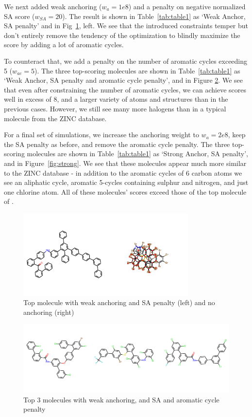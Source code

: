 \documentclass{article}
\begin{document}
We next added weak anchoring ($w_{a} =1e8$) and a penalty on negative normalized SA score ($w_{SA}=20$). The result is shown in Table~\ref{tab:table1} as `Weak Anchor, SA penalty' and in Fig~\ref{fig:optim}, left. We see that the introduced constraints temper but don't entirely remove the tendency of the optimization to blindly maximize the score by adding a lot of aromatic cycles.

To counteract that, we add a penalty on the number of aromatic cycles exceeding 5 ($w_{ac}=5$). The three top-scoring molecules are shown in Table~\ref{tab:table1} as `Weak Anchor, SA penalty and aromatic cycle penalty', and in Figure \ref{fig:weak}. We see that even after constraining the number of aromatic cycles, we can achieve scores well in excess of 8, and a larger variety of atoms and structures than in the previous cases. However, we still see many more halogens than in a typical molecule from the ZINC database.

For a final set of simulations, we increase the anchoring weight to $w_{a} =2e8$, keep the SA penalty as before, and remove the aromatic cycle penalty. The three top-scoring molecules are shown in Table~\ref{tab:table1} as `Strong Anchor, SA penalty', and in Figure~\ref{fig:strong}. We see that these molecules appear much more similar to the ZINC database - in addition to the aromatic cycles of 6 carbon atoms we see an aliphatic cycle, aromatic 5-cycles containing sulphur and nitrogen, and just one chlorine atom. All of these molecules' scores exceed those of the top molecule of \cite{jin18}.

\begin{figure}[ht]
	\centering
	\includegraphics[width=0.8\textwidth]{large.pdf}
	\caption{Top molecule with weak anchoring and SA penalty (left) and no anchoring (right)}	\label{fig:optim}
\end{figure}
\begin{figure}[ht]
	\centering
	\includegraphics[width=\textwidth]{weak.pdf}
	\caption{Top 3 molecules with weak anchoring, and SA and aromatic cycle penalty}\label{fig:weak}
\end{figure}
\end{document}

